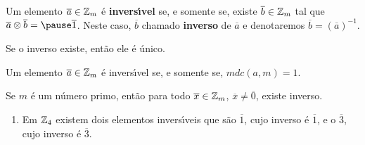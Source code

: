 \documentclass{beamer}
\begin{document}
    \begin{frame}
        \begin{definicao}
            Um elemento $\overline{a} \in \mathbb{Z}_m$ {\'e} \textbf{invers{\'\i}vel} \pause se, e somente se, existe $\overline{b} \in \mathbb{Z}_m$ \pause tal que $\overline{a} \otimes \overline{b} = \pause \overline{1}$. \pause Neste caso, $\overline{b}$  chamado \textbf{inverso} de $\overline{a}$ \pause e denotaremos $\overline{b} = (\overline{a})^{-1}$.\pause
        \end{definicao}

        \begin{proposicao}
            Se o inverso existe, \pause ent\~ao ele {\'e} {\'u}nico.\pause
        \end{proposicao}
    \end{frame}

    \begin{frame}
        \begin{proposicao}
            Um elemento $\overline{a} \in \mathbb{Z}_m$ {\'e} \pause invers{\'\i}vel \pause se, e somente se, $mdc(a,m) = 1$.\pause
        \end{proposicao}

        \begin{corolario}
            Se $m$ \'e um n\'umero primo, \pause ent\~ao para todo $\overline{x} \in \mathbb{Z}_m$, \pause $\overline{x} \ne \overline{0}$, \pause existe inverso.\pause
        \end{corolario}

        \begin{exemplos}
            \begin{enumerate}[label={\arabic*})]
                \item[i)] Em $\mathbb{Z}_4$ existem dois elementos invers{\'\i}veis \pause que s{\~a}o $\overline{1}$, \pause cujo inverso {\'e} $\overline{1}$, \pause e o $\overline{3}$, \pause cujo inverso {\'e} $\overline{3}$.\pause
            \end{enumerate}
        \end{exemplos}
    \end{frame}
\end{document}

